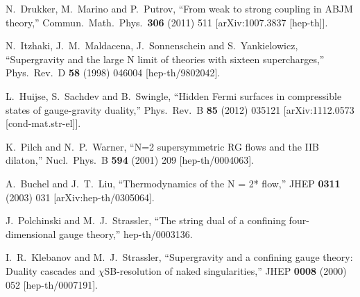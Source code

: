 \begin{thebibliography}{99}
  N.~Drukker, M.~Marino and P.~Putrov,
  ``From weak to strong coupling in ABJM theory,''
  Commun.\ Math.\ Phys.\  {\bf 306} (2011) 511
  [arXiv:1007.3837 [hep-th]].

  N.~Itzhaki, J.~M.~Maldacena, J.~Sonnenschein and S.~Yankielowicz,
  ``Supergravity and the large N limit of theories with sixteen supercharges,''
  Phys.\ Rev.\ D {\bf 58} (1998) 046004
  [hep-th/9802042].

  L.~Huijse, S.~Sachdev and B.~Swingle,
  ``Hidden Fermi surfaces in compressible states of gauge-gravity duality,''
  Phys.\ Rev.\ B {\bf 85} (2012) 035121
  [arXiv:1112.0573 [cond-mat.str-el]].


  K.~Pilch and N.~P.~Warner,
  ``N=2 supersymmetric RG flows and the IIB dilaton,''
  Nucl.\ Phys.\ B {\bf 594} (2001) 209
  [hep-th/0004063].
  
  A.~Buchel and J.~T.~Liu,
  ``Thermodynamics of the N = 2* flow,''
  JHEP {\bf 0311} (2003) 031
  [arXiv:hep-th/0305064].

  
  J.~Polchinski and M.~J.~Strassler,
  ``The string dual of a confining four-dimensional gauge theory,''
  hep-th/0003136.


  
  I.~R.~Klebanov and M.~J.~Strassler,
  ``Supergravity and a confining gauge theory: Duality cascades and $\chi$SB-resolution of naked singularities,''
  JHEP {\bf 0008} (2000) 052
  [hep-th/0007191].



\end{thebibliography}
